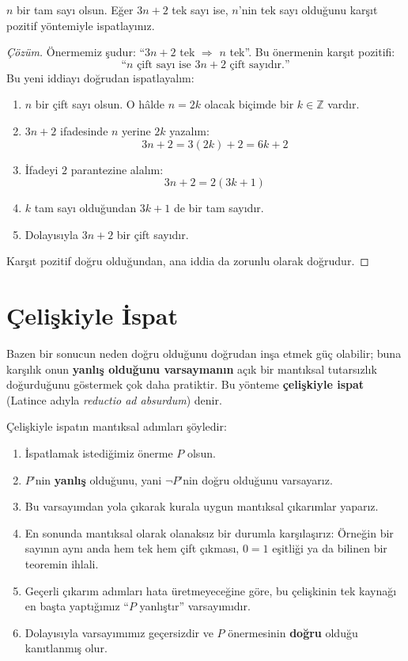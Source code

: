\begin{example}
$n$ bir tam sayı olsun. Eğer $3n + 2$ tek sayı ise, $n$'nin tek sayı olduğunu karşıt pozitif yöntemiyle ispatlayınız.
\end{example}
\begin{proof}[Çözüm]
Önermemiz şudur: ``$3n + 2$ tek $\Rightarrow$ $n$ tek''.
Bu önermenin karşıt pozitifi:
\[ \text{``$n$ çift sayı ise $3n + 2$ çift sayıdır.''} \]
Bu yeni iddiayı doğrudan ispatlayalım:
\begin{enumerate}
  \item $n$ bir çift sayı olsun. O hâlde $n = 2k$ olacak biçimde bir $k \in \mathbb{Z}$ vardır.
  \item $3n + 2$ ifadesinde $n$ yerine $2k$ yazalım:
  \[ 3n + 2 = 3(2k) + 2 = 6k + 2 \]
  \item İfadeyi $2$ parantezine alalım:
  \[ 3n + 2 = 2(3k + 1) \]
  \item $k$ tam sayı olduğundan $3k + 1$ de bir tam sayıdır.
  \item Dolayısıyla $3n + 2$ bir çift sayıdır.
\end{enumerate}
Karşıt pozitif doğru olduğundan, ana iddia da zorunlu olarak doğrudur.
\end{proof}


\section{Çelişkiyle İspat}

Bazen bir sonucun neden doğru olduğunu doğrudan inşa etmek güç olabilir; buna karşılık onun \textbf{yanlış olduğunu varsaymanın} açık bir mantıksal tutarsızlık doğurduğunu göstermek çok daha pratiktir. Bu yönteme \textbf{çelişkiyle ispat} (Latince adıyla \textit{reductio ad absurdum}) denir.

Çelişkiyle ispatın mantıksal adımları şöyledir:
\begin{enumerate}
  \item İspatlamak istediğimiz önerme $P$ olsun.
  \item $P$'nin \textbf{yanlış} olduğunu, yani $\neg P$'nin doğru olduğunu varsayarız.
  \item Bu varsayımdan yola çıkarak kurala uygun mantıksal çıkarımlar yaparız.
  \item En sonunda mantıksal olarak olanaksız bir durumla karşılaşırız: Örneğin bir sayının aynı anda hem tek hem çift çıkması, $0 = 1$ eşitliği ya da bilinen bir teoremin ihlali.
  \item Geçerli çıkarım adımları hata üretmeyeceğine göre, bu çelişkinin tek kaynağı en başta yaptığımız ``$P$ yanlıştır'' varsayımıdır.
  \item Dolayısıyla varsayımımız geçersizdir ve $P$ önermesinin \textbf{doğru} olduğu kanıtlanmış olur.
\end{enumerate}


